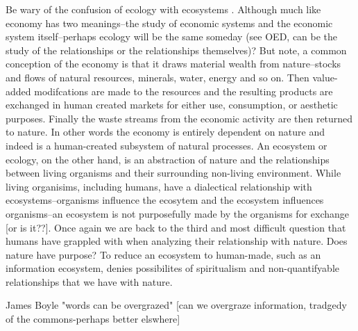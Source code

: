 Be wary of the confusion of ecology with ecosystems \citep[cf. ][]{lucas_2012,nardi_information_1999}. Although much like economy has two meanings--the study of economic systems and the economic system itself--perhaps ecology will be the same someday (see OED, can be the study of the relationships or the relationships themselves)? But note, a common conception of the economy is that it draws material wealth from nature--stocks and flows of natural resources, minerals, water, energy and so on. Then value-added modifcations are made to the resources and the resulting products are exchanged in human created markets for either use, consumption, or aesthetic purposes. Finally the waste streams from the economic activity are then returned to nature. In other words the economy is entirely dependent on nature and indeed is a human-created subsystem of natural processes. An ecosystem or ecology, on the other hand, is an abstraction of nature and the relationships between living organisms and their surrounding non-living environment. While living organisims, including humans, have a dialectical relationship with ecosystems--organisms influence the ecosytem and the ecosystem influences organisms--an ecosystem is not purposefully made by the organisms for exchange [or is it??]. Once again we are back to the third and most difficult question that humans have grappled with when analyzing their relationship with nature. Does nature have purpose? To reduce an ecosystem to human-made, such as an information ecosystem, denies possibilites of spiritualism and non-quantifyable relationships that we have with nature.

James Boyle "words can be overgrazed" [can we overgraze information, tradgedy of the commons-perhaps better elswhere]

